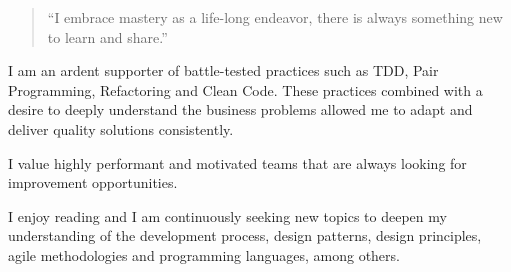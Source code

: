 \documentclass[10pt,letterpaper,ragged2d,withhyper]{altacv}
\begin{document}
\begin{paracol}{2}

% 
% 
% 
% 
% 
% 
% 


\switchcolumn


\begin{quote}
``I embrace mastery as a life-long endeavor, there is always something new to learn and share.''
\end{quote}


I am an ardent supporter of battle-tested practices such as TDD, Pair Programming, Refactoring and Clean Code. These practices combined with a desire to deeply understand the business problems allowed me to adapt and deliver quality solutions consistently.

I value highly performant and motivated teams that are always looking for improvement opportunities.

I enjoy reading and I am continuously seeking new topics to deepen my understanding of the development process, design patterns, design principles, agile methodologies and programming languages, among others.



\end{paracol}
\end{document}
